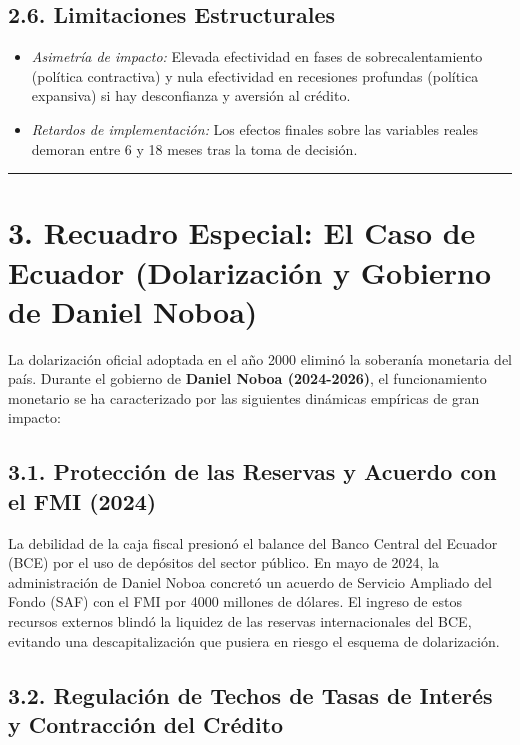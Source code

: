 \documentclass[12pt,spanish]{article}
\providecommand{\tightlist}{%
  \setlength{\itemsep}{0pt}\setlength{\parskip}{0pt}}
\begin{document}
\subsection{2.6. Limitaciones
Estructurales}\label{limitaciones-estructurales}

\begin{itemize}
\tightlist
\item
  \emph{Asimetría de impacto:} Elevada efectividad en fases de
  sobrecalentamiento (política contractiva) y nula efectividad en
  recesiones profundas (política expansiva) si hay desconfianza y
  aversión al crédito.
\item
  \emph{Retardos de implementación:} Los efectos finales sobre las
  variables reales demoran entre 6 y 18 meses tras la toma de decisión.
\end{itemize}

\begin{center}\rule{0.5\linewidth}{0.5pt}\end{center}

\section{3. Recuadro Especial: El Caso de Ecuador (Dolarización y
Gobierno de Daniel
Noboa)}\label{recuadro-especial-el-caso-de-ecuador-dolarizaciuxf3n-y-gobierno-de-daniel-noboa}

La dolarización oficial adoptada en el año 2000 eliminó la soberanía
monetaria del país. Durante el gobierno de \textbf{Daniel Noboa
(2024-2026)}, el funcionamiento monetario se ha caracterizado por las
siguientes dinámicas empíricas de gran impacto:

\subsection{3.1. Protección de las Reservas y Acuerdo con el FMI
(2024)}\label{protecciuxf3n-de-las-reservas-y-acuerdo-con-el-fmi-2024}

La debilidad de la caja fiscal presionó el balance del Banco Central del
Ecuador (BCE) por el uso de depósitos del sector público. En mayo de
2024, la administración de Daniel Noboa concretó un acuerdo de Servicio
Ampliado del Fondo (SAF) con el FMI por 4000 millones de dólares. El
ingreso de estos recursos externos blindó la liquidez de las reservas
internacionales del BCE, evitando una descapitalización que pusiera en
riesgo el esquema de dolarización.

\subsection{3.2. Regulación de Techos de Tasas de Interés y Contracción
del
Crédito}\label{regulaciuxf3n-de-techos-de-tasas-de-interuxe9s-y-contracciuxf3n-del-cruxe9dito}
\end{document}
